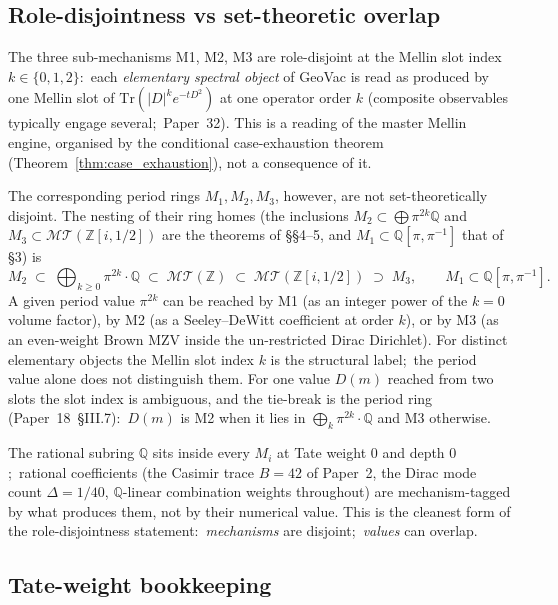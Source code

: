 \documentclass[11pt,a4paper]{article}
\theoremstyle{plain}
\theoremstyle{definition}
\newcommand{\Z}{\mathbb{Z}}
\newcommand{\Q}{\mathbb{Q}}
\newcommand{\Tr}{\mathrm{Tr}}
\newcommand{\MT}{\mathcal{MT}}
\begin{document}
\subsection{Role-disjointness vs set-theoretic overlap}

The three sub-mechanisms M1, M2, M3 are role-disjoint at the Mellin
slot index $k \in \{0, 1, 2\}$:\ each \emph{elementary spectral
object} of GeoVac is read as produced by one Mellin slot of
$\Tr(|D|^k e^{-tD^2})$ at one operator order $k$ (composite observables
typically engage several;\ Paper~32).  This is a reading of the master
Mellin engine, organised by the conditional case-exhaustion theorem
(Theorem~\ref{thm:case_exhaustion}), not a consequence of it.

The corresponding period rings $M_1, M_2, M_3$, however, are not
set-theoretically disjoint.  The nesting of their ring homes (the
inclusions $M_2 \subset \bigoplus \pi^{2k}\Q$ and
$M_3 \subset \MT(\Z[i,1/2])$ are the theorems of \S\S 4--5, and
$M_1 \subset \Q[\pi, \pi^{-1}]$ that of \S 3) is
\begin{equation}
\label{eq:ring_nesting}
M_2 \;\subset\; \bigoplus_{k \ge 0} \pi^{2k}\cdot\Q
\;\subset\; \MT(\Z)
\;\subset\; \MT(\Z[i, 1/2]) \;\supset\; M_3,
\qquad
M_1 \subset \Q[\pi, \pi^{-1}].
\end{equation}
A given period value $\pi^{2k}$ can be reached by M1 (as an integer
power of the $k = 0$ volume factor), by M2 (as a Seeley--DeWitt
coefficient at order $k$), or by M3 (as an even-weight Brown MZV
inside the un-restricted Dirac Dirichlet).  For distinct elementary
objects the Mellin slot index $k$ is the structural label;\ the period
value alone does not distinguish them.  For one value $D(m)$ reached
from two slots the slot index is ambiguous, and the tie-break is the
period ring (Paper~18~\S III.7):\ $D(m)$ is M2 when it lies in
$\bigoplus_k \pi^{2k}\cdot\Q$ and M3 otherwise.

The rational subring $\Q$ sits inside every $M_i$ at Tate weight
$0$ and depth $0$;\ rational coefficients (the Casimir trace
$B = 42$ of Paper~2, the Dirac mode count $\Delta = 1/40$, $\Q$-linear
combination weights throughout) are mechanism-tagged by what
produces them, not by their numerical value.  This is the cleanest
form of the role-disjointness statement:\ \emph{mechanisms} are
disjoint;\ \emph{values} can overlap.

\subsection{Tate-weight bookkeeping}
\end{document}
